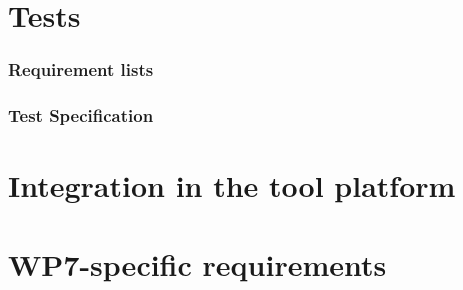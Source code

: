 \documentclass{template/openetcs_report}
\begin{document}

\chapter{Tests}

\label{chap:test}
    \subsection{Requirement lists}
    \subsection{Test Specification}




\chapter{Integration in the tool platform}
\label{chap:integration}






\appendix





\chapter{WP7-specific requirements}
\label{app:WP7Req}


\end{document}
